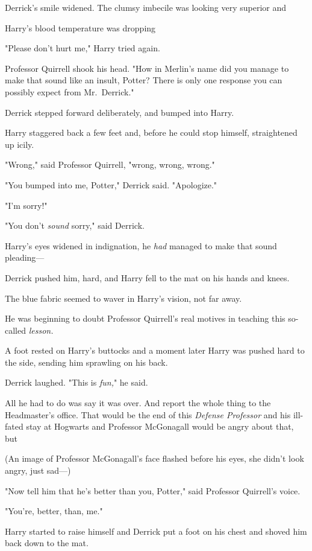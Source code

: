 Derrick's smile widened. The clumsy imbecile was looking very superior
and{\el}

{\el} Harry's blood temperature was dropping{\el}

"Please don't hurt me," Harry tried again.

Professor Quirrell shook his head. "How in Merlin's name did you manage to make
that sound like an insult, Potter? There is only one response you can possibly
expect from Mr.~Derrick."

Derrick stepped forward deliberately, and bumped into Harry.

Harry staggered back a few feet and, before he could stop himself, straightened
up icily.

"Wrong," said Professor Quirrell, "wrong, wrong, wrong."

"You bumped into me, Potter," Derrick said. "Apologize."

"I'm sorry!"

"You don't \emph{sound} sorry," said Derrick.

Harry's eyes widened in indignation, he \emph{had} managed to make that sound
pleading---

Derrick pushed him, hard, and Harry fell to the mat on his hands and knees.

The blue fabric seemed to waver in Harry's vision, not far away.

He was beginning to doubt Professor Quirrell's real motives in teaching this
so-called \emph{lesson.}

A foot rested on Harry's buttocks and a moment later Harry was pushed hard to
the side, sending him sprawling on his back.

Derrick laughed. "This is \emph{fun,}" he said.

All he had to do was say it was over. And report the whole thing to the
Headmaster's office. That would be the end of this \emph{Defense Professor} and
his ill-fated stay at Hogwarts and{\el} Professor McGonagall would be angry
about that, but{\el}

(An image of Professor McGonagall's face flashed before his eyes, she didn't
look angry, just sad---)

"Now tell him that he's better than you, Potter," said Professor Quirrell's
voice.

"You're, better, than, me."

Harry started to raise himself and Derrick put a foot on his chest and shoved
him back down to the mat.

